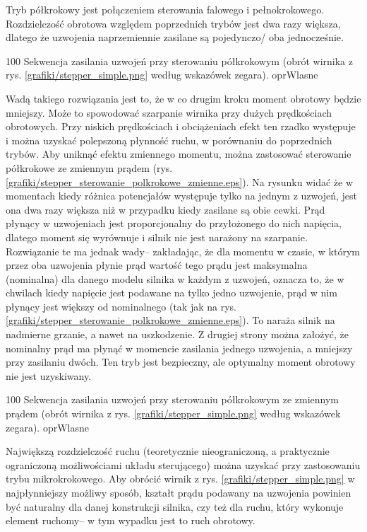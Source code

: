 \clearpage


Tryb półkrokowy jest połączeniem sterowania falowego i pełnokrokowego. Rozdzielczość obrotowa względem poprzednich trybów jest dwa razy większa, dlatego że uzwojenia naprzemiennie zasilane są pojedynczo/ oba jednocześnie.

		{100}
		{Sekwencja zasilania uzwojeń przy sterowaniu półkrokowym (obrót wirnika z rys. \ref{grafiki/stepper_simple.png} według wskazówek zegara).}
		{oprWlasne}
		
Wadą takiego rozwiązania jest to, że w co drugim kroku moment obrotowy będzie mniejszy. Może to spowodować szarpanie wirnika przy dużych prędkościach obrotowych. Przy niskich prędkościach i obciążeniach efekt ten rzadko występuje i można uzyskać polepszoną płynność ruchu, w porównaniu do poprzednich trybów. Aby uniknąć efektu zmiennego momentu, można zastosować sterowanie półkrokowe ze zmiennym prądem (rys. \ref{grafiki/stepper_sterowanie_polkrokowe_zmienne.eps}). Na rysunku widać że w momentach kiedy różnica potencjałów występuje tylko na jednym z uzwojeń, jest ona dwa razy większa niż w przypadku kiedy zasilane są obie cewki. Prąd płynący w uzwojeniach jest proporcjonalny do przyłożonego do nich napięcia, dlatego moment się wyrównuje i silnik nie jest narażony na szarpanie. Rozwiązanie te ma jednak wady-- zakładając, że dla momentu w czasie, w którym przez oba uzwojenia płynie prąd wartość tego prądu jest maksymalna (nominalna) dla danego modelu silnika w każdym z uzwojeń, oznacza to, że w chwilach kiedy napięcie jest podawane na tylko jedno uzwojenie, prąd w nim płynący jest większy od nominalnego (tak jak na rys. \ref{grafiki/stepper_sterowanie_polkrokowe_zmienne.eps}). To naraża silnik na nadmierne grzanie, a nawet na uszkodzenie. Z drugiej strony można założyć, że nominalny prąd ma płynąć w momencie zasilania jednego uzwojenia, a mniejszy przy zasilaniu dwóch. Ten tryb jest bezpieczny, ale optymalny moment obrotowy nie jest uzyskiwany.

		{100}
		{Sekwencja zasilania uzwojeń przy sterowaniu półkrokowym ze zmiennym prądem (obrót wirnika z rys. \ref{grafiki/stepper_simple.png} według wskazówek zegara).}
		{oprWlasne}
		

Największą rozdzielczość ruchu (teoretycznie nieograniczoną, a praktycznie ograniczoną możliwościami układu sterującego) można uzyskać przy zastosowaniu trybu mikrokrokowego. Aby obrócić wirnik z rys. \ref{grafiki/stepper_simple.png} w najpłynniejszy możliwy sposób, kształt prądu podawany na uzwojenia powinien być naturalny dla danej konstrukcji silnika, czy też dla ruchu, który wykonuje element ruchomy-- w tym wypadku jest to ruch obrotowy. 

